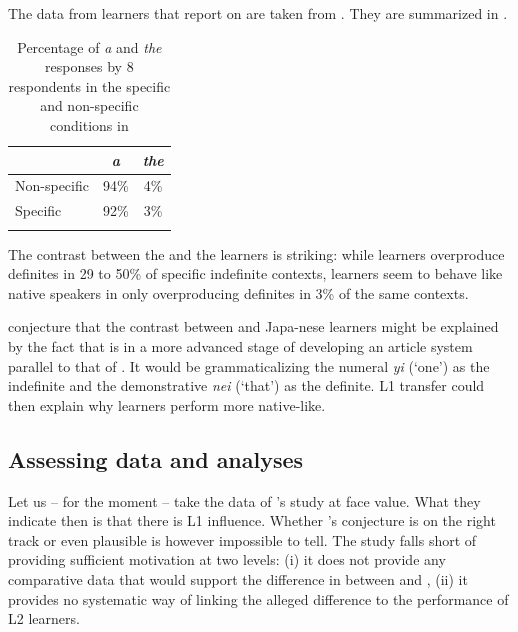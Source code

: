 \documentclass[output=paper,
modfonts
]{langscibook}
\begin{document}
The data from  learners that \citet{SnapeLeungTing2006} report on are taken from \citet{Ting2005}. They are summarized in .

\begin{table}[h]
\begin{tabular}{lcc}
\lsptoprule
 & \textit{a} & \textit{the} \\
\midrule
Non-specific & 94\% & 4\%  \\
Specific & 92\% & 3\% \\
\lspbottomrule
\end{tabular}
\caption{Percentage of \textit{a} and \textit{the} responses by 8  respondents in the specific and non-specific conditions in \citet{Ting2005}}
\label{tab:lebruyn:5}
\end{table}

The contrast between the  and the  learners is striking: while  learners overproduce definites in 29 to 50\% of specific indefinite contexts,  learners seem to behave like native speakers in only overproducing definites in 3\% of the same contexts.

\citet{SnapeLeungTing2006} conjecture that the contrast between  and Japa\hyp{}nese learners might be explained by the fact that  is in a more advanced stage of developing an article system parallel to that of . It would be grammaticalizing the numeral \textit{yi} (‘one’) as the indefinite and the demonstrative \textit{nei} (‘that’) as the definite. L1 transfer could then explain why  learners perform more native-like.

\subsection{Assessing data and analyses}

Let us -- for the moment -- take the data of \citeauthor{Ting2005}’s study at face value. What they indicate then is that there is L1 influence. Whether \citeauthor{SnapeLeungTing2006}’s conjecture is on the right track or even plausible is however impossible to tell. The study falls short of providing sufficient motivation at two levels: (i) it does not provide any comparative data that would support the difference in  between  and , (ii) it provides no systematic way of linking the alleged difference to the performance of L2 learners.
\end{document}

